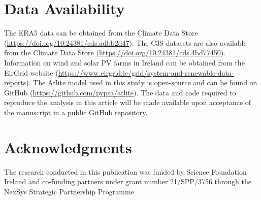 \documentclass[preprint, 12pt]{elsarticle}
\begin{document}
\section*{Data Availability}

The ERA5 data can be obtained from the Climate Data Store (\url{https://doi.org/10.24381/cds.adbb2d47}). The C3S datasets are also available from the Climate Data Store (\url{https://doi.org/10.24381/cds.4bd77450}). Information on wind and solar PV farms in Ireland can be obtained from the EirGrid website (\url{https://www.eirgrid.ie/grid/system-and-renewable-data-reports}). The Atlite model used in this study is open-source and can be found on GitHub (\url{https://github.com/pypsa/atlite}). The data and code required to reproduce the analysis in this article will be made available upon acceptance of the manuscript in a public GitHub repository.

\section*{Acknowledgments}

The research conducted in this publication was funded by Science Foundation Ireland and co-funding partners under grant number 21/SPP/3756 through the NexSys Strategic Partnership Programme.



\end{document}
